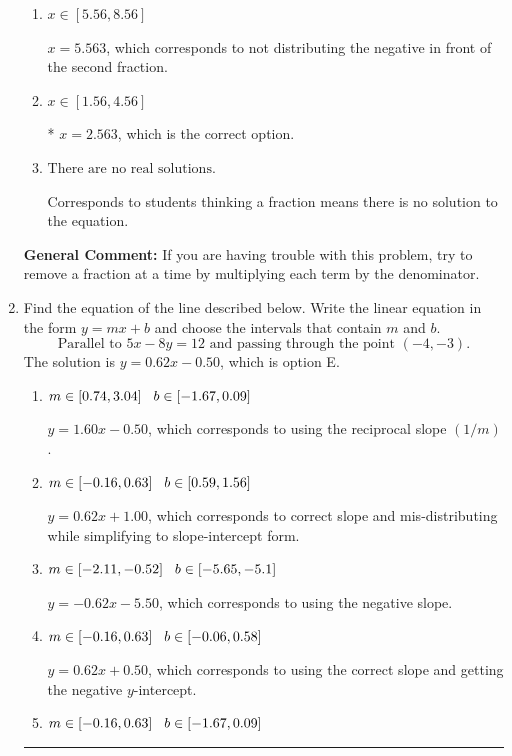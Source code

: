 \documentclass{extbook}[14pt]
\newcommand{\litem}[1]{\item #1

\rule{\textwidth}{0.4pt}}
\begin{document}
\begin{enumerate}
{\begin{enumerate}[label=\Alph*.]
 $x = 0.205$, which corresponds to dividing the second number in the numerator by the denominator rather than dividing BOTH parts of the numerator by the denominator (or removing the fractions through multiplication).
\item \( x \in [5.56, 8.56] \)

 $x = 5.563$, which corresponds to not distributing the negative in front of the second fraction.
\item \( x \in [1.56, 4.56] \)

* $x = 2.563$, which is the correct option.
\item \( \text{There are no real solutions.} \)

Corresponds to students thinking a fraction means there is no solution to the equation.
\end{enumerate}

\textbf{General Comment:} If you are having trouble with this problem, try to remove a fraction at a time by multiplying each term by the denominator.
}
\litem{
Find the equation of the line described below. Write the linear equation in the form $ y=mx+b $ and choose the intervals that contain $m$ and $b$.
\[ \text{Parallel to } 5 x - 8 y = 12 \text{ and passing through the point } (-4, -3). \]The solution is \( y = 0.62x - 0.50 \), which is option E.\begin{enumerate}[label=\Alph*.]
\item \( m \in [0.74, 3.04] \hspace*{3mm} b \in [-1.67, 0.09] \)

 $y = 1.60x - 0.50$, which corresponds to using the reciprocal slope $(1/m)$.
\item \( m \in [-0.16, 0.63] \hspace*{3mm} b \in [0.59, 1.56] \)

 $y = 0.62x + 1.00$, which corresponds to correct slope and mis-distributing while simplifying to slope-intercept form.
\item \( m \in [-2.11, -0.52] \hspace*{3mm} b \in [-5.65, -5.1] \)

 $y = -0.62x - 5.50$, which corresponds to using the negative slope.
\item \( m \in [-0.16, 0.63] \hspace*{3mm} b \in [-0.06, 0.58] \)

 $y = 0.62x + 0.50$, which corresponds to using the correct slope and getting the negative $y$-intercept.
\item \( m \in [-0.16, 0.63] \hspace*{3mm} b \in [-1.67, 0.09] \)


\end{enumerate}}
\end{enumerate}
\end{document}

